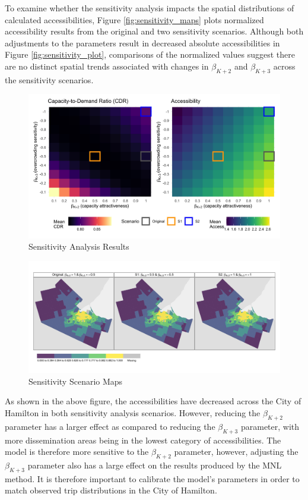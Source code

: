 \documentclass[]{elsarticle} %
\begin{document}
To examine whether the sensitivity analysis impacts the spatial
distributions of calculated accessibilities, Figure
\ref{fig:sensitivity_maps} plots normalized accessibility results from
the original and two sensitivity scenarios. Although both adjustments to
the parameters result in decreased absolute accessibilities in Figure
\ref{fig:sensitivity_plot}, comparisons of the normalized values suggest
there are no distinct spatial trends associated with changes in
\(\beta_{K + 2}\) and \(\beta_{K + 3}\) across the sensitivity
scenarios.

\begin{figure}
\includegraphics[width=1\linewidth]{./img/sensitivity_plot} \caption{\label{fig:sensitivity_plot}Sensitivity Analysis Results}\label{fig:plot sensitivity_tiles}
\end{figure}

\begin{figure}
\includegraphics[width=1\linewidth]{./img/sensitivity_maps} \caption{\label{fig:sensitivity_maps}Sensitivity Scenario Maps}\label{fig:plot sensitivity_maps}
\end{figure}

As shown in the above figure, the accessibilities have decreased across
the City of Hamilton in both sensitivity analysis scenarios. However,
reducing the \(\beta_{K+2}\) parameter has a larger effect as compared
to reducing the \(\beta_{K + 3}\) parameter, with more dissemination
areas being in the lowest category of accessibilities. The model is
therefore more sensitive to the \(\beta_{K+2}\) parameter, however,
adjusting the \(\beta_{K + 3}\) parameter also has a large effect on the
results produced by the MNL method. It is therefore important to
calibrate the model's parameters in order to match observed trip
distributions in the City of Hamilton.
\end{document}
